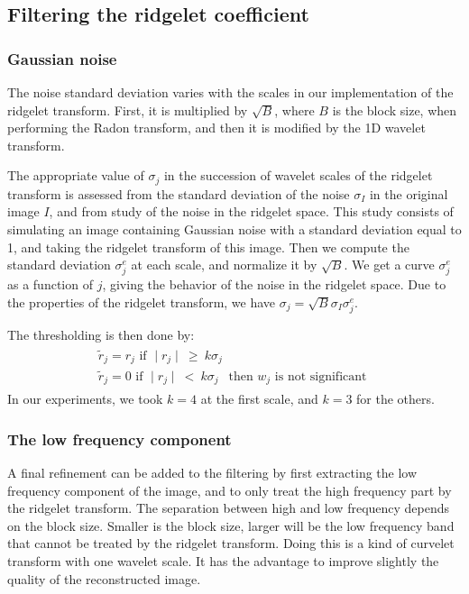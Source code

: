 \documentclass[11pt,a4paper]{article}
\begin{document}
\subsection{Filtering the ridgelet coefficient}

\subsubsection{Gaussian noise}
 The noise standard deviation varies with the scales in our 
implementation of the ridgelet transform. First, it is multiplied
by $\sqrt{B}$, where $B$ is the block size, when performing the Radon
transform, and then it is modified by the 1D wavelet transform.

The appropriate value of $\sigma_j$ 
in the succession of wavelet scales of the ridgelet transform is assessed 
from the standard deviation of the noise $\sigma_I$ in the original image
$I$, and from study of the noise in the ridgelet space.  This study consists of 
simulating an image containing Gaussian noise with a standard deviation 
equal to 1, and taking the ridgelet transform of this image.  Then we
compute the standard deviation $\sigma^e_j$ at each scale, and normalize
it by  $\sqrt{B}$.  We get a curve 
$\sigma^e_j$ as a function of $j$, giving the behavior of the noise in the 
ridgelet space.  Due to the properties of the ridgelet transform, we have 
$ \sigma_j = \sqrt{B} \sigma_I \sigma^e_j $.

The thresholding is then done by:
\begin{eqnarray}
\begin{array}{l}
\tilde r_j = r_j \mbox{ if }  \mid r_j \mid \ \geq \ k \sigma_j \\ 
\tilde r_j = 0 \mbox{ if }  \mid r_j \mid \ < \ k \sigma_j \ \ \mbox{ then } w_j \mbox{ is not significant }
\end{array}
\end{eqnarray}
In our experiments, we took $k=4$ at the first scale,  and $k=3$
for the others.


\subsubsection{The low frequency component}
 A final refinement can be added to the filtering by first extracting
the low frequency component of the image, and to only treat the 
high frequency part by the ridgelet transform. The separation
between high and low frequency depends on the block size. Smaller 
is the block size, larger will be the low frequency band that cannot
be treated by the ridgelet transform. Doing this is a kind 
of curvelet transform with one wavelet scale. It has the advantage to
improve slightly the quality of the reconstructed image. 
\end{document}
